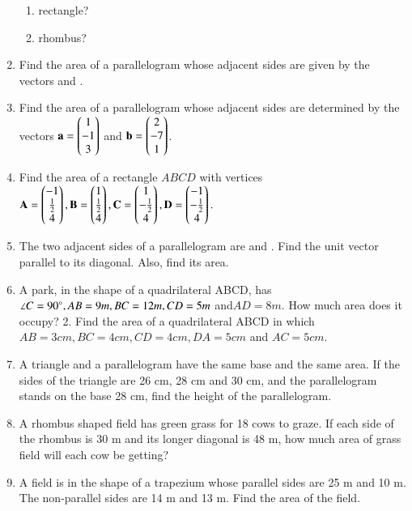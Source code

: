 \begin{enumerate}[label=\arabic*.,ref=\thesubsection.\theenumi]
\begin{enumerate}
\item rectangle?
\item rhombus?
\end{enumerate}
\item Find the area of a parallelogram whose adjacent sides are given by the vectors  and .
\item Find the area of a parallelogram whose adjacent sides are determined by the vectors $\mathbf{a} = \begin{pmatrix}1\\-1\\3\end{pmatrix}$ and $\mathbf{b}=\begin{pmatrix}2\\-7\\1\end{pmatrix}$.
\item Find the area of a rectangle $ABCD$ with vertices
$\mathbf{A} = \begin{pmatrix}-1\\\frac{1}{2}\\ 4\end{pmatrix},
 \mathbf{B} = \begin{pmatrix}1\\\frac{1}{2}\\ 4\end{pmatrix},
\mathbf{C} = \begin{pmatrix}1\\-\frac{1}{2}\\ 4\end{pmatrix},
\mathbf{D} = \begin{pmatrix}-1\\-\frac{1}{2}\\ 4\end{pmatrix}.
$
\item The two adjacent sides of a parallelogram are  and  . Find the unit vector parallel to its diagonal.  Also, find its area.
%
\item A park, in the shape of a quadrilateral ABCD, has $\angle C = 90\degree, AB = 9 m, BC = 12 m, CD = 5 m$ and$ AD = 8 m$. How much area does it occupy?
2. Find the area of a quadrilateral ABCD in which $AB = 3 cm, BC = 4 cm, CD = 4 cm, DA = 5 cm$ and $AC = 5 cm$.
\item A triangle and a parallelogram have the same base and the same area. If the sides of the triangle are 26 cm, 28 cm and 30 cm, and the parallelogram stands on the base 28 cm, find the height of the parallelogram.
\item A rhombus shaped field has green grass for 18 cows to graze. If each side of the rhombus is 30 m and its longer diagonal is 48 m, how much area of grass field will each cow be getting?
\item A field is in the shape of a trapezium whose parallel sides are 25 m and 10 m. The non-parallel sides are 14 m and 13 m. Find the area of the field.
\end{enumerate}
%
